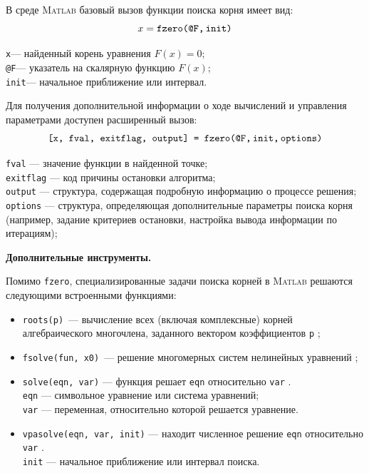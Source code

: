 \documentclass[12pt,a4paper]{article}
\theoremstyle{bigplain}
\theoremstyle{plain}
\begin{document}
\medskip

\noindent
В среде \textsc{Matlab} базовый вызов функции поиска корня имеет вид:
\[
x = \texttt{fzero(@F,\,init)}
\]

\noindent
\texttt{x}\hspace{1.8em}--- найденный корень уравнения $F(x)=0$;\\
\texttt{@F}\hspace{1em}--- указатель на скалярную функцию $F(x)$;\\
\texttt{init}\hspace{0.6em}--- начальное приближение или интервал.

\medskip

\noindent
Для получения дополнительной информации о ходе вычислений и управления параметрами доступен расширенный вызов:
\[
\texttt{[x, fval, exitflag, output] = fzero(@F,\,init,\,options)}
\]

\noindent
\texttt{fval} --- значение функции в найденной точке; \\
\texttt{exitflag} --- код причины остановки алгоритма; \\
\texttt{output} --- структура, содержащая подробную информацию о процессе решения; \\
\texttt{options} --- структура, определяющая дополнительные параметры поиска корня (например, задание критериев остановки, настройка вывода информации по итерациям);

\medskip

\noindent\textbf{Дополнительные инструменты.}

\noindent
Помимо \texttt{fzero}, специализированные задачи поиска корней в \textsc{Matlab} решаются следующими встроенными функциями:
\begin{itemize}
    \vspace{-2pt}
    \item \texttt{roots(p)}~--- вычисление всех (включая комплексные) корней алгебраического многочлена, заданного вектором коэффициентов \texttt{p} \cite{Matlab};
    \vspace{-2pt}
    \item \texttt{fsolve(fun, x0)}~--- решение многомерных систем нелинейных уравнений \cite{Matlab};
    \vspace{-2pt}
    \item \texttt{solve(eqn,\,var)} --- функция решает \texttt{eqn} относительно \texttt{var} \cite{Matlab}.\\
    \texttt{eqn} --- символьное уравнение или система уравнений;\\
    \texttt{var} --- переменная, относительно которой решается уравнение.
    \vspace{-2pt}
    \item \texttt{vpasolve(eqn,\,var,\,init)} --- находит численное решение \texttt{eqn} относительно \texttt{var} \cite{Matlab}.\\
    \texttt{init} --- начальное приближение или интервал поиска.
\end{itemize}
\end{document}
